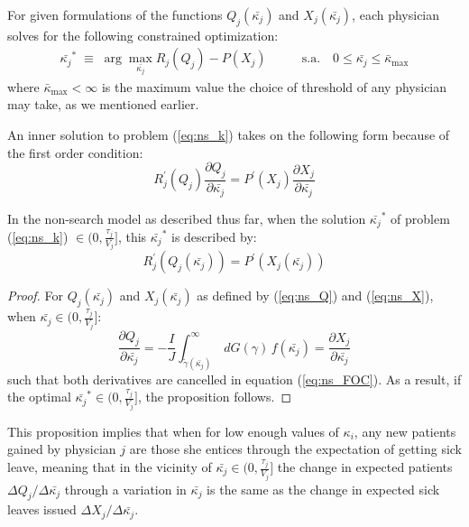 \documentclass[../main.tex]{subfiles}
\begin{document}
For given formulations of the functions $Q_j(\bar{\kappa_j})$ and $X_j(\bar{\kappa_j})$, each physician solves for the following constrained optimization:
\begin{align}
\bar{\kappa_j}^* \; \equiv \; \operatorname{arg}\max_{\bar{\kappa_j}} R_j(Q_j) - P(X_j) & \hspace{2em} \text{s.a.} \hspace{1em} 0 \leq \bar{\kappa_j} \leq \bar{\kappa}_{\max}
\label{eq:ns_k}
\end{align}
where $\bar{\kappa}_{\max} < \infty$ is the maximum value the choice of threshold of any physician may take, as we mentioned earlier.

An inner solution to problem (\ref{eq:ns_k}) takes on the following form because of the first order condition:
\begin{equation}
    R_j^{\prime}(Q_j)\frac{\partial Q_j}{\partial\bar{\kappa_j}}  = P^{\prime}(X_j)\frac{\partial X_j}{\partial \bar{\kappa_j}}
\label{eq:ns_FOC}
\end{equation}

\vspace{0.5em}

\begin{prop}
    \label{ns_prop}
In the non-search model as described thus far, when the solution $\bar{\kappa_j}^*$ of problem (\ref{eq:ns_k}) $\in (0,\frac{\tau_j}{V_j}]$, this $\bar{\kappa_j}^*$ is described by: 
\begin{equation*}
    R_j^{\prime}(Q_j(\bar{\kappa_j}))  = P^{\prime}(X_j(\bar{\kappa_j}))
\end{equation*}
\end{prop}

\begin{proof}
For $Q_j(\bar{\kappa_j})$ and $X_j(\bar{\kappa_j})$ as defined by (\ref{eq:ns_Q}) and (\ref{eq:ns_X}), when $\bar{\kappa_j} \in (0,\frac{\tau_j}{V_j}]$:
\[
\frac{\partial Q_j}{\partial\bar{\kappa_j}} = - \frac{I}{J} \int_{\tilde{\gamma}(\bar{\kappa_j})}^{\infty} \,dG(\gamma) \,f(\bar{\kappa_j}) = \frac{\partial X_j}{\partial\bar{\kappa_j}}
\]
such that both derivatives are cancelled in equation (\ref{eq:ns_FOC}). As a result, if the optimal $\bar{\kappa_j}^* \in (0,\frac{\tau_j}{V_j}]$, the proposition follows.
\end{proof}

This proposition implies that when for low enough values of $\kappa_i$, any new patients gained by physician $j$ are those she entices through the expectation of getting sick leave, meaning that in the vicinity of $\bar{\kappa_j} \in (0,\frac{\tau_j}{V_j}]$ the change in expected patients $\Delta Q_j/\Delta\bar{\kappa_j}$ through a variation in $\bar{\kappa_j}$ is the same as the change in expected sick leaves issued $\Delta X_j/\Delta \bar{\kappa_j}$.
\end{document}
